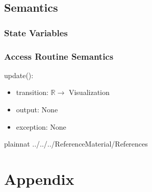 \documentclass[12pt, titlepage]{article}
\begin{document}
\subsection{Semantics}

\subsubsection{State Variables}

\subsubsection{Access Routine Semantics}

\noindent update():
\begin{itemize}
	\item transition: $\mathbb{R} \rightarrow$ Visualization 
	\item output: None 
	\item exception: None  
\end{itemize}

\newpage

 {plainnat}
 {../../../ReferenceMaterial/References}

\newpage

\section{Appendix} \label{Appendix}

\end{document}
